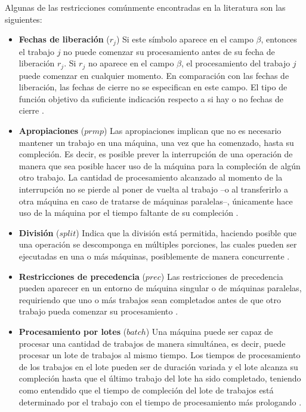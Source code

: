 \documentclass[spanish,draft,12pt,headsepline,footsepline,paper=letter]{scrreprt}
\begin{document}
Algunas de las restricciones comúnmente encontradas en la literatura son las siguientes:

\begin{itemize}
  \item \textbf{Fechas de liberación} ($r_j$) Si este símbolo aparece en el campo $\beta$, entonces el trabajo $j$ no puede comenzar su procesamiento antes de su fecha de liberación $r_j$. Si $r_j$ no aparece en el campo $\beta$, el procesamiento del trabajo $j$ puede comenzar en cualquier momento. En comparación con las fechas de liberación, las fechas de cierre no se especifican en este campo. El tipo de función objetivo da suficiente indicación respecto a si hay o no fechas de cierre \citep[p.~16]{Pinedo1995}.
  \item \textbf{Apropiaciones} ($prmp$) Las apropiaciones implican que no es necesario mantener un trabajo en una máquina, una vez que ha comenzado, hasta su compleción. Es decir, es posible prever la interrupción de una operación de manera que sea posible hacer uso de la máquina para la compleción de algún otro trabajo. La cantidad de procesamiento alcanzado al momento de la interrupción no se pierde al poner de vuelta al trabajo –o al transferirlo a otra máquina en caso de tratarse de máquinas paralelas–, únicamente hace uso de la máquina por el tiempo faltante de su compleción \citep[p.~16, p.~10]{Pinedo1995,TKindt2002}.
  \item \textbf{División} ($split$) Indica que la división está permitida, haciendo posible que una operación se descomponga en múltiples porciones, las cuales pueden ser ejecutadas en una o más máquinas, posiblemente de manera concurrente \citep[p.~10]{TKindt2002}.
  \item \textbf{Restricciones de precedencia} ($prec$) Las restricciones de precedencia pueden aparecer en un entorno de máquina singular o de máquinas paralelas, requiriendo que uno o más trabajos sean completados antes de que otro trabajo pueda comenzar su procesamiento \citep[p.~16]{Pinedo1995}.
  \item \textbf{Procesamiento por lotes} ($batch$) Una máquina puede ser capaz de procesar una cantidad de trabajos de manera simultánea, es decir, puede procesar un lote de trabajos al mismo tiempo. Los tiempos de procesamiento de los trabajos en el lote pueden ser de duración variada y el lote alcanza su compleción hasta que el último trabajo del lote ha sido completado, teniendo como entendido que el tiempo de compleción del lote de trabajos está determinado por el trabajo con el tiempo de procesamiento más prologando \citep[p.~16]{Pinedo1995}.

\end{itemize}
\end{document}
